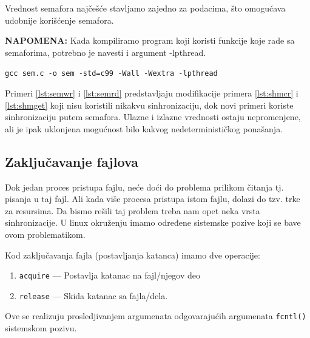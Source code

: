 \documentclass[a4paper, 11pt, twoside]{article}
\newcommand{\scode}[3] {
	\hspace{.06\textwidth} 
	\begin{minipage}[t]{.88\textwidth} %
		\begin{mdframed}[topline=true,bottomline=true,leftline=true,rightline=true,backgroundcolor=gray!22, linecolor=gray!60!black,roundcorner=1mm]
			 

	\begin{center}
		\caption{\textbf{Primer \ref{lst:#3}:} #2}
	\end{center}
	\end{mdframed}
	\end{minipage}

}
\begin{document}
Vrednost semafora najčešće stavljamo zajedno za podacima, što omogućava udobnije korišćenje semafora.

\scode{structsem.c}{Struktura koja sadrži semafore}{semstruct}


\vspace{2mm} 
 \textbf{NAPOMENA:} Kada kompiliramo program koji koristi funkcije koje rade sa semaforima, potrebno je navesti i argument -lpthread. 

\begin{center}
	\texttt{gcc sem.c -o sem -std=c99 -Wall -Wextra -lpthread} 
\end{center}



\newpage

Primeri \ref{lst:semwr} i \ref{lst:semrd} predstavljaju modifikacije  primera \ref{lst:shmcr} i \ref{lst:shmget} koji nisu koristili nikakvu sinhronizaciju, dok novi primeri koriste sinhronizaciju putem semafora. Ulazne i izlazne vrednosti ostaju nepromenjene, ali je ipak uklonjena mogućnost bilo kakvog nedeterminističkog ponašanja.

\scode{sem_shm_writer.c}{Modifikacija primera \ref{lst:shmcr}}{semwr}

\scode{sem_shm_reader.c}{Modifikacija primera \ref{lst:shmget}}{semrd}

\subsection{Zaključavanje fajlova}

Dok jedan proces pristupa fajlu, neće doći do problema prilikom čitanja tj. pisanja u taj fajl. Ali kada više procesa pristupa istom fajlu, dolazi do tzv. trke za resursima. Da bismo rešili taj problem treba nam opet neka vrsta sinhronizacije. U linux okruženju imamo određene sistemske pozive koji se bave ovom problematikom.

Kod zaključavanja fajla (postavljanja katanca) imamo dve operacije: 
\vspace{-2mm} 
\begin{enumerate}[1)]
	\item{\texttt{acquire} --- Postavlja katanac na fajl/njegov deo}
	\item{\texttt{release} --- Skida katanac sa fajla/dela}.
\end{enumerate}

Ove se realizuju prosledjivanjem argumenata odgovarajućih argumenata \texttt{fcntl()} sistemskom pozivu.
\end{document}
